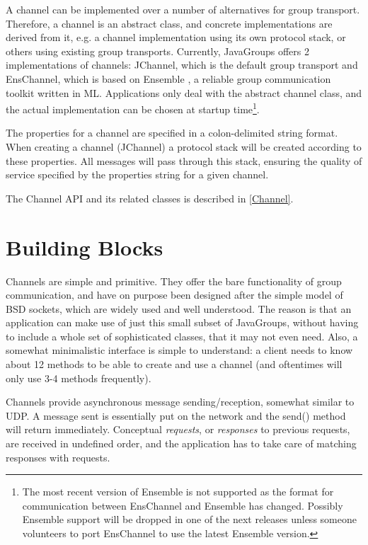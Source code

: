   A channel can be implemented over a number of alternatives for group
  transport. Therefore, a channel is an abstract class, and concrete implementations
  are derived from it, e.g. a channel implementation using its own protocol stack, or
  others using existing group transports. Currently, JavaGroups offers 2
  implementations of channels: JChannel, which is the default group transport and
  EnsChannel, which is based on Ensemble \cite{Ensemble:1997}, a reliable group
  communication toolkit written in ML. Applications only deal with the abstract
  channel class, and the actual implementation can be chosen at startup
  time\footnote{The most recent version of Ensemble is not supported as the format
  for communication between EnsChannel and Ensemble has changed. Possibly Ensemble
  support will be dropped in one of the next releases unless someone volunteers to
  port EnsChannel to use the latest Ensemble version.}.

  The properties for a channel are specified in a colon-delimited string format.
  When creating a channel (JChannel) a protocol stack will be created according to
  these properties. All messages will pass through this stack, ensuring the quality
  of service specified by the properties string for a given channel.
  
  The Channel API and its related classes is described in \ref{Channel}.



  \section{Building Blocks}
    
  Channels are simple and primitive. They offer the bare functionality of group
  communication, and have on purpose been designed after the simple model of BSD
  sockets, which are widely used and well understood. The reason is that an
  application can make use of just this small subset of JavaGroups, without having to
  include a whole set of sophisticated classes, that it may not even need. Also, a
  somewhat minimalistic interface is simple to understand: a client needs to know
  about 12 methods to be able to create and use a channel (and oftentimes will only
  use 3-4 methods frequently).

  Channels provide asynchronous message sending/reception, somewhat similar to UDP. A
  message sent is essentially put on the network and the send() method will return
  immediately. Conceptual {\em requests}, or {\em responses} to previous requests,
  are received in undefined order, and the application has to take care of matching
  responses with requests.

